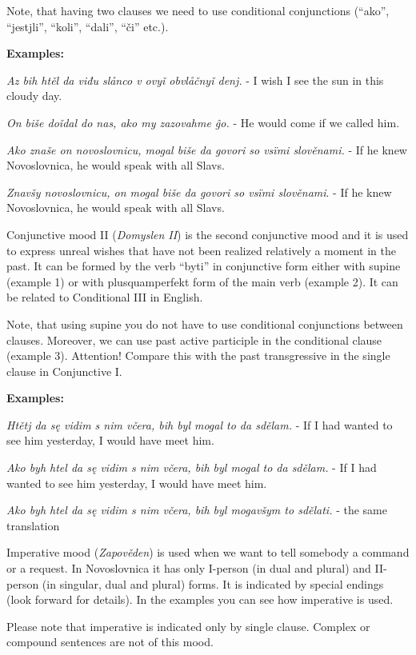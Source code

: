 Note, that having two clauses we need to use conditional conjunctions (“ako”, “jestjli”, “koli”, “dali”, “či” etc.).

\textbf{Examples:}

\textit{Az bih htěl da viđu slånco v ovyǐ obvlåčnyǐ denj.} - I wish I see the sun in this cloudy day.

\textit{On biše doǐdal do nas, ako my zazovahme ĝo.} - He would come if we called him.

\textit{Ako znaše on novoslovnicu, mogal biše da govori so vsïmi slověnami.} - If he knew Novoslovnica, he would speak with all Slavs.

\textit{Znavšy novoslovnicu, on mogal biše da govori so vsïmi slověnami}. - If he knew Novoslovnica, he would speak with all Slavs.

Conjunctive mood II (\textit{Domyslen II}) is the second conjunctive mood and it is used to express unreal wishes that have not been realized relatively a moment in the past. It can be formed by the verb “byti” in conjunctive form either  with supine (example 1) or with plusquamperfekt form of the main verb (example 2). It can be related to Conditional III in English. 

Note, that using supine you do not have to use conditional conjunctions between clauses. Moreover, we can use past active participle in the conditional clause (example 3). Attention! Compare this with the past transgressive in the single clause in Conjunctive I.

\textbf{Examples:}

\textit{Htětj da sę vidim s nim včera, bih byl mogal to da sdělam.} - If  I had wanted to see him yesterday, I would have meet him.

\textit{Ako byh htel da sę vidim s nim včera, bih byl mogal to da sdělam.} - If  I had wanted to see him yesterday, I would have meet him.

\textit{Ako byh htel da sę vidim s nim včera, bih byl mogavšym to sdělati.} - the same translation

Imperative mood (\textit{Zapověden})  is used when we want to tell somebody a command or a request. In Novoslovnica it has only I-person (in dual and plural) and II-person (in singular, dual and plural) forms. It is indicated by special endings (look forward for details). In the examples you can see how imperative is used.

Please note that imperative is indicated only by single clause. Complex or compound sentences are not of this mood.

